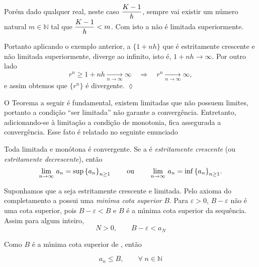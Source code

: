 Por\'{e}m dado qualquer real, neste caso $\displaystyle{\frac{K-1}{h}}$, sempre vai existir um n\'{u}mero natural $m\in\mathbb{N}$ tal que
$\displaystyle{\frac{K-1}{h}<m}$. Com isto a \seq n\~{a}o \'{e} limitada superiormente.

Portanto aplicando o exemplo anterior, a \seq $\{1+nh\}$ que \'{e}
estritamente crescente e n\~{a}o limitada superiormente, diverge ao
infinito, isto \'{e}, $1+nh\to\infty$. Por outro lado
\begin{equation*}
    r^n\geq 1+nh\xrightarrow[n\to\infty]{}\infty\quad
    \Rightarrow\quad r^n\xrightarrow[n\to\infty]{}\infty,
\end{equation*}
e assim obtemos que $\{r^n\}$ \'{e} divergente.  \hfill \(\lozenge\)


O Teorema a seguir \'{e} fundamental, existem \seqs limitadas que n\~{a}o possuem limites, 
portanto a condi\c{c}\~{a}o ``ser limitada''  n\~{a}o garante a converg\^{e}ncia. Entretanto, 
adicionando-se \`{a} limita\c{c}\~{a}o a condi\c{c}\~{a}o de monotonia, fica assegurada a 
converg\^{e}ncia. Esse fato \'{e} relatado no seguinte enunciado

\begin{fteo}\label{bolza}
Toda \seq  limitada e mon\'{o}tona \'{e} convergente. Se a
\seq {} \'{e} \textit{ estritamente crescente} (ou \textit{estritamente decrescente}), ent\~{a}o
\begin{equation*}
  \displaystyle{\lim_{n\to \infty}\,{a}_{n}} =\sup \displaystyle{\left\{a_{n}\right\}_{n\geq 1}}\qquad \textrm{ ou }\qquad
  \displaystyle{\lim_{n\to \infty}\,{a}_{n}} =\inf \displaystyle{\left\{a_{n}\right\}_{n\geq 1}}.
\end{equation*}
\end{fteo}

\prova Suponhamos que a \seq {} seja estritamente
crescente e limitada. Pelo axioma do completamento a \seq
{} possui uma \textit{min\'{\i}ma cota superior} $B$. Para $
\varepsilon>0$, $B-\varepsilon$ n\~{a}o \'{e} uma cota superior, pois
$B-\varepsilon<B$ e $B$ \'{e} a m\'{\i}nima cota superior da sequ\^{e}ncia.  Assim
para algum inteiro,
\begin{equation}\label{cota_1}
  N>0,\qquad B-\varepsilon<a_N
\end{equation}

Como $B$ \'{e} a m\'{\i}nima cota superior de , ent\~{a}o

\begin{equation}\label{cota_2}
  a_n\leq B,\qquad \forall\; n\in \mathbb{N}
\end{equation}

